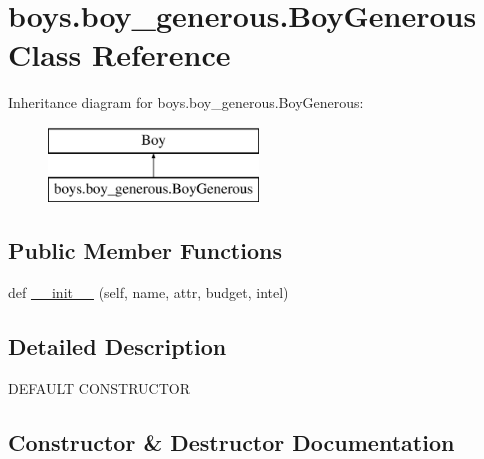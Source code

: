 \hypertarget{classboys_1_1boy__generous_1_1_boy_generous}{}\section{boys.\+boy\+\_\+generous.\+Boy\+Generous Class Reference}
\label{classboys_1_1boy__generous_1_1_boy_generous}
Inheritance diagram for boys.\+boy\+\_\+generous.\+Boy\+Generous\+:\begin{figure}[H]
\begin{center}
\leavevmode
\includegraphics[height=2.000000cm]{classboys_1_1boy__generous_1_1_boy_generous}
\end{center}
\end{figure}
\subsection*{Public Member Functions}
\begin{DoxyCompactItemize}
\item 
def \hyperlink{classboys_1_1boy__generous_1_1_boy_generous_a831025420e531d226f244c6a41628a41}{\+\_\+\+\_\+init\+\_\+\+\_\+} (self, name, attr, budget, intel)
\end{DoxyCompactItemize}


\subsection{Detailed Description}
\begin{DoxyVerb}DEFAULT CONSTRUCTOR\end{DoxyVerb}
 

\subsection{Constructor \& Destructor Documentation}
